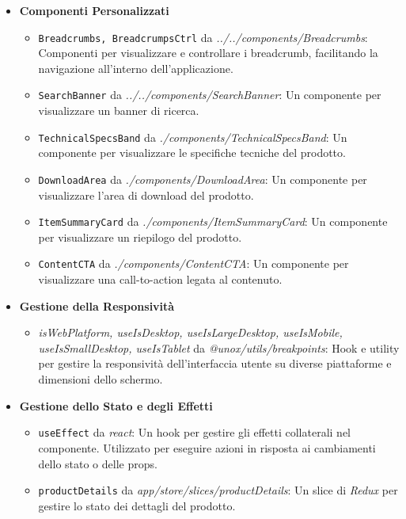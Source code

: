 \begin{itemize}
    \item \textbf{Componenti Personalizzati}
    \begin{itemize}
        \item \texttt{Breadcrumbs, BreadcrumpsCtrl} da \textit{../../components/Breadcrumbs}: Componenti per visualizzare e controllare i breadcrumb, facilitando la navigazione all'interno dell'applicazione.
        \item \texttt{SearchBanner} da \textit{../../components/SearchBanner}: Un componente per visualizzare un banner di ricerca.
        \item \texttt{TechnicalSpecsBand} da \textit{./components/TechnicalSpecsBand}: Un componente per visualizzare le specifiche tecniche del prodotto.
        \item \texttt{DownloadArea} da \textit{./components/DownloadArea}: Un componente per visualizzare l'area di download del prodotto.
        \item \texttt{ItemSummaryCard} da \textit{./components/ItemSummaryCard}: Un componente per visualizzare un riepilogo del prodotto.
        \item \texttt{ContentCTA} da \textit{./components/ContentCTA}: Un componente per visualizzare una call-to-action legata al contenuto.
    \end{itemize}

    \item \textbf{Gestione della Responsività}
    \begin{itemize}
        \item \textit{isWebPlatform, useIsDesktop, useIsLargeDesktop, useIsMobile, useIsSmallDesktop, useIsTablet} da \textit{@unox/utils/breakpoints}: Hook e utility per gestire la responsività dell'interfaccia utente su diverse piattaforme e dimensioni dello schermo.
    \end{itemize}

    \item \textbf{Gestione dello Stato e degli Effetti}
    \begin{itemize}
        \item \texttt{useEffect} da \textit{react}: Un hook per gestire gli effetti collaterali nel componente. Utilizzato per eseguire azioni in risposta ai cambiamenti dello stato o delle props.
        \item \texttt{productDetails} da \textit{app/store/slices/productDetails}: Un slice di \textit{Redux} per gestire lo stato dei dettagli del prodotto.
    \end{itemize}
\end{itemize}

